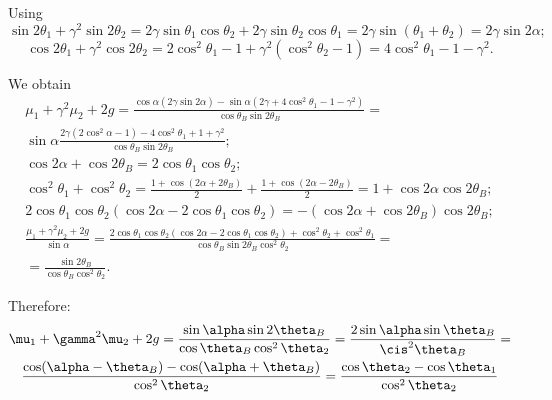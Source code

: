 \documentclass[preprint]{iucr}              %
\begin{document}
Using
\begin{equation}
    \sin2\theta_1+\gamma^2\sin2\theta_2=2\gamma\sin\theta_1\cos\theta_2+2\gamma\sin\theta_2\cos\theta_1=2\gamma\sin(\theta_1+\theta_2)=2\gamma\sin2\alpha;
\end{equation}
\begin{equation}
    \cos2\theta_1+\gamma^2\cos2\theta_2=2\cos^2\theta_1-1+\gamma^2(\cos^2\theta_2-1)=4\cos^2\theta_1-1-\gamma^2.
\end{equation}
                   
We obtain
\begin{multline}
    \mu_1+\gamma^2\mu_2+2g=
    \frac{\cos\alpha(2\gamma\sin2\alpha)-\sin\alpha(2\gamma+4\cos^2\theta_1-1-\gamma^2)}{\cos\theta_B\sin2\theta_B} = \\
    \sin\alpha
    \frac{2\gamma(2\cos^2\alpha-1)-4\cos^2\theta_1+1+\gamma^2}{\cos\theta_B\sin2\theta_B};\\
    \cos2\alpha+\cos2\theta_B=2\cos\theta_1\cos\theta_2; \\
    \cos^2\theta_1+\cos^2\theta_2=
    \frac{1+\cos(2\alpha+2\theta_B)}{2}
    +\frac{1+\cos(2\alpha-2\theta_B)}{2}=
    1+\cos2\alpha\cos2\theta_B; \\
    2\cos\theta_1\cos\theta_2(\cos2\alpha-2\cos\theta_1\cos\theta_2)=-(\cos2\alpha+\cos2\theta_B)\cos2\theta_B;\\
    \frac{\mu_1+\gamma^2\mu_2+2g}{\sin\alpha}=
    \frac{2\cos\theta_1\cos\theta_2(\cos2\alpha-2\cos\theta_1\cos\theta_2)+\cos^2\theta_2+\cos^2\theta_1}{\cos\theta_B\sin2\theta_B\cos^2\theta_2}=\\
    =\frac{\sin2\theta_B}{\cos\theta_B\cos^2\theta_2}.
\end{multline}

Therefore:
\begin{multline}
    \mu_1+\gamma^2\mu_2+2g=
    \frac{\sin\alpha\sin2\theta_B}{\cos\theta_B\cos^2\theta_2}=
    \frac{2\sin\alpha\sin\theta_B}{\cis^2\theta_B}=\\
    \frac{\cos(\alpha-\theta_B)-\cos(\alpha+\theta_B)}{\cos^2\theta_2}=
    \frac{\cos\theta_2-\cos\theta_1}{\cos^2\theta_2}
\end{multline}





\end{document}
